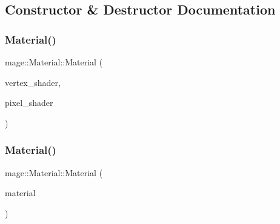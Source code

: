 \subsection{Constructor \& Destructor Documentation}
\hypertarget{classmage_1_1_material_a60ff5af1b5f634568954e9a0b714e85b}{}\label{classmage_1_1_material_a60ff5af1b5f634568954e9a0b714e85b} 
\subsubsection{\texorpdfstring{Material()}{Material()}\hspace{0.1cm}{\footnotesize\ttfamily [1/2]}}
{\footnotesize\ttfamily mage\+::\+Material\+::\+Material (\begin{DoxyParamCaption}\item[{\hyperlink{namespacemage_a1e01ae66713838a7a67d30e44c67703e}{Shared\+Ptr}$<$ \hyperlink{classmage_1_1_vertex_shader}{Vertex\+Shader} $>$}]{vertex\+\_\+shader,  }\item[{\hyperlink{namespacemage_a1e01ae66713838a7a67d30e44c67703e}{Shared\+Ptr}$<$ \hyperlink{classmage_1_1_pixel_shader}{Pixel\+Shader} $>$}]{pixel\+\_\+shader }\end{DoxyParamCaption})}

\hypertarget{classmage_1_1_material_a49a45a14ea59239597c6258ff01a705e}{}\label{classmage_1_1_material_a49a45a14ea59239597c6258ff01a705e} 
\subsubsection{\texorpdfstring{Material()}{Material()}\hspace{0.1cm}{\footnotesize\ttfamily [2/2]}}
{\footnotesize\ttfamily mage\+::\+Material\+::\+Material (\begin{DoxyParamCaption}\item[{const \hyperlink{classmage_1_1_material}{Material} \&}]{material }\end{DoxyParamCaption})}

\hypertarget{classmage_1_1_material_a536bc060adb4a43607f2469f81dc5ce3}{}\label{classmage_1_1_material_a536bc060adb4a43607f2469f81dc5ce3} 
